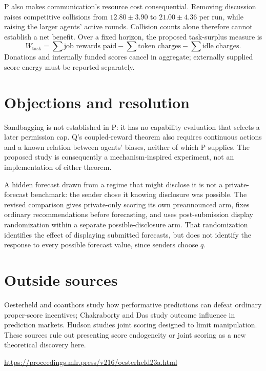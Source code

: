\documentclass{article}
\begin{document}
P also makes communication's resource cost consequential. Removing discussion raises competitive collisions from \(12.80\pm3.90\) to \(21.00\pm4.36\) per run, while raising the larger agents' active rounds. Collision counts alone therefore cannot establish a net benefit. Over a fixed horizon, the proposed task-surplus measure is
\[
W_{\mathrm{task}}
=\sum \text{job rewards paid}
-\sum \text{token charges}
-\sum \text{idle charges}.
\]
Donations and internally funded scores cancel in aggregate; externally supplied score energy must be reported separately. 

\section*{Objections and resolution}

Sandbagging is not established in P: it has no capability evaluation that selects a later permission cap. Q's coupled-reward theorem also requires continuous actions and a known relation between agents' biases, neither of which P supplies. The proposed study is consequently a mechanism-inspired experiment, not an implementation of either theorem. 

A hidden forecast drawn from a regime that might disclose it is not a private-forecast benchmark: the sender chose it knowing disclosure was possible. The revised comparison gives private-only scoring its own preannounced arm, fixes ordinary recommendations before forecasting, and uses post-submission display randomization within a separate possible-disclosure arm. That randomization identifies the effect of displaying submitted forecasts, but does not identify the response to every possible forecast value, since senders choose \(q\). 

\section*{Outside sources}

Oesterheld and coauthors study how performative predictions can defeat ordinary proper-score incentives; Chakraborty and Das study outcome influence in prediction markets. Hudson studies joint scoring designed to limit manipulation. These sources rule out presenting score endogeneity or joint scoring as a new theoretical discovery here. 

\noindent
\url{https://proceedings.mlr.press/v216/oesterheld23a.html}
\end{document}
